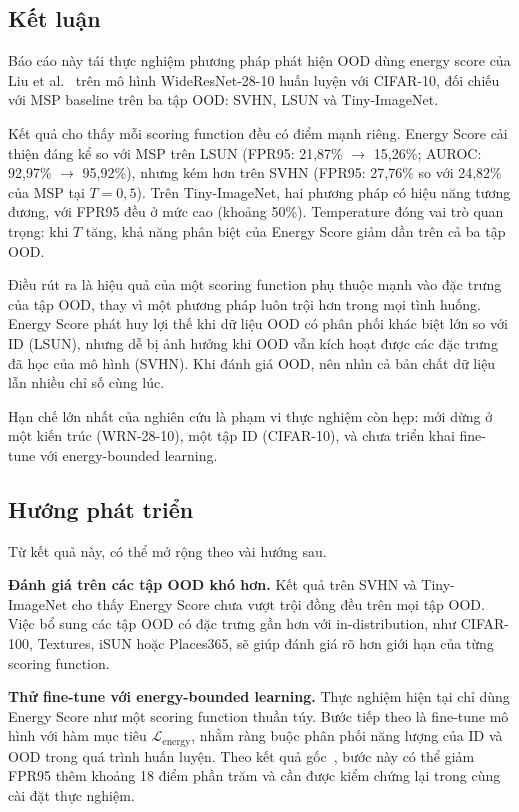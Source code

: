 \documentclass[12pt,a4paper]{article}
\begin{document}
\subsection{Kết luận}

Báo cáo này tái thực nghiệm phương pháp phát hiện OOD dùng energy score của Liu et al.~\cite{energyood} trên mô hình WideResNet-28-10 huấn luyện với CIFAR-10, đối chiếu với MSP baseline trên ba tập OOD: SVHN, LSUN và Tiny-ImageNet.

Kết quả cho thấy mỗi scoring function đều có điểm mạnh riêng. Energy Score cải thiện đáng kể so với MSP trên LSUN (FPR95: 21,87\% $\rightarrow$ 15,26\%; AUROC: 92,97\% $\rightarrow$ 95,92\%), nhưng kém hơn trên SVHN (FPR95: 27,76\% so với 24,82\% của MSP tại $T=0{,}5$). Trên Tiny-ImageNet, hai phương pháp có hiệu năng tương đương, với FPR95 đều ở mức cao (khoảng 50\%). Temperature đóng vai trò quan trọng: khi $T$ tăng, khả năng phân biệt của Energy Score giảm dần trên cả ba tập OOD.

Điều rút ra là hiệu quả của một scoring function phụ thuộc mạnh vào đặc trưng của tập OOD, thay vì một phương pháp luôn trội hơn trong mọi tình huống. Energy Score phát huy lợi thế khi dữ liệu OOD có phân phối khác biệt lớn so với ID (LSUN), nhưng dễ bị ảnh hưởng khi OOD vẫn kích hoạt được các đặc trưng đã học của mô hình (SVHN). Khi đánh giá OOD, nên nhìn cả bản chất dữ liệu lẫn nhiều chỉ số cùng lúc.

Hạn chế lớn nhất của nghiên cứu là phạm vi thực nghiệm còn hẹp: mới dừng ở một kiến trúc (WRN-28-10), một tập ID (CIFAR-10), và chưa triển khai fine-tune với energy-bounded learning.

\subsection{Hướng phát triển}

Từ kết quả này, có thể mở rộng theo vài hướng sau.

\textbf{Đánh giá trên các tập OOD khó hơn.}
Kết quả trên SVHN và Tiny-ImageNet cho thấy Energy Score chưa vượt trội đồng đều trên mọi tập OOD. Việc bổ sung các tập OOD có đặc trưng gần hơn với in-distribution, như CIFAR-100, Textures, iSUN hoặc Places365, sẽ giúp đánh giá rõ hơn giới hạn của từng scoring function.

\textbf{Thử fine-tune với energy-bounded learning.}
Thực nghiệm hiện tại chỉ dùng Energy Score như một scoring function thuần túy. Bước tiếp theo là fine-tune mô hình với hàm mục tiêu $\mathcal{L}_{\text{energy}}$, nhằm ràng buộc phân phối năng lượng của ID và OOD trong quá trình huấn luyện. Theo kết quả gốc~\cite{energyood}, bước này có thể giảm FPR95 thêm khoảng 18 điểm phần trăm và cần được kiểm chứng lại trong cùng cài đặt thực nghiệm.
\end{document}
